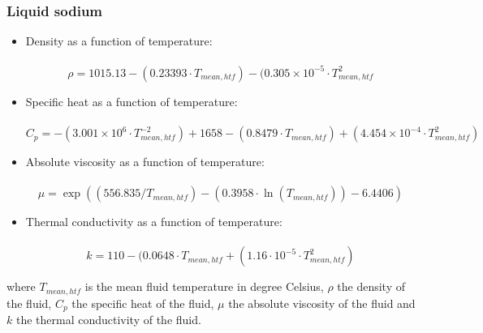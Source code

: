 \subsubsection{Liquid sodium}
\begin{itemize}
	\item Density as a function of temperature:\\\\
	\begin{equation}
	\rho = 1015.13 - (0.23393 \cdot T_{mean,htf}) - (0.305 \times 10^{-5} \cdot T_{mean,htf}^2
	\end{equation}
	\item Specific heat as a function of temperature:\\\\
	\begin{equation}
	C_{p} = -(3.001 \times 10^6 \cdot T_{mean,htf}^{-2}) + 1658 - (0.8479 \cdot T_{mean,htf}) + (4.454 \times 10^{-4} \cdot T_{mean,htf}^2)
	\end{equation}
	\item Absolute viscosity as a function of temperature:\\\\
	\begin{equation}
	\mu = \exp((556.835 / T_{mean,htf}) - (0.3958 \cdot \ln (T_{mean,htf})) - 6.4406)
	\end{equation}
	\item Thermal conductivity as a function of temperature:\\\\
	\begin{equation}
	k = 110 - (0.0648 \cdot T_{mean,htf} + (1.16 \cdot 10^{-5} \cdot T_{mean,htf}^2)
	\end{equation}
\end{itemize}
where $T_{mean,htf}$ is the mean fluid temperature in degree Celsius, $\rho$ the density of the fluid, $C_{p}$ the specific heat of the fluid,
$\mu$ the absolute viscosity of the fluid and $k$ the thermal conductivity of the fluid.
